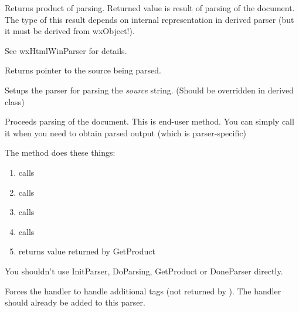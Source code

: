 
Returns product of parsing. Returned value is result of parsing
of the document. The type of this result depends on internal
representation in derived parser (but it must be derived from wxObject!).

See wxHtmlWinParser for details.

\label{wxhtmlparsergetsource}


Returns pointer to the source being parsed.


\label{wxhtmlparserinitparser}


Setups the parser for parsing the {\it source} string. (Should be overridden
in derived class)

\label{wxhtmlparserparse}


Proceeds parsing of the document. This is end-user method. You can simply
call it when you need to obtain parsed output (which is parser-specific)

The method does these things:

\begin{enumerate}\itemsep=0pt
\item calls 
\item calls 
\item calls 
\item calls 
\item returns value returned by GetProduct
\end{enumerate}

You shouldn't use InitParser, DoParsing, GetProduct or DoneParser directly.



\label{wxhtmlparserpushtaghandler}


Forces the handler to handle additional tags 
(not returned by ). 
The handler should already be added to this parser.

